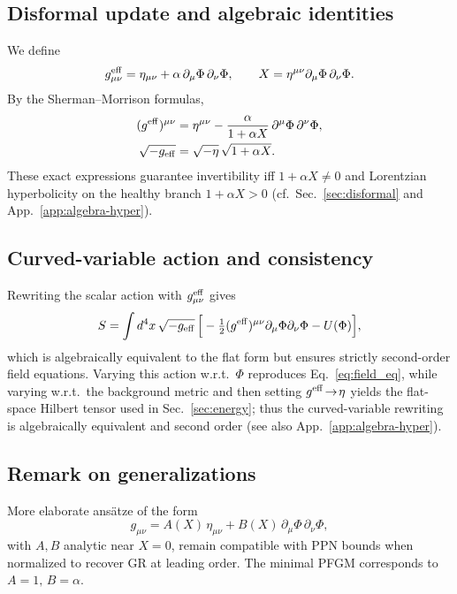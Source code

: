 \documentclass{article}
\begin{document}
\subsection*{Disformal update and algebraic identities}
We define
\begin{equation}
g^{\rm eff}_{\mu\nu}=\eta_{\mu\nu}+\alpha\,\partial_\mu\Phi\,\partial_\nu\Phi, 
\qquad 
X=\eta^{\mu\nu}\partial_\mu\Phi\,\partial_\nu\Phi .
\end{equation}
By the Sherman--Morrison formulas,
\begin{align}
(g^{\rm eff})^{\mu\nu}&=\eta^{\mu\nu}-\frac{\alpha}{1+\alpha X}\,\partial^\mu\Phi\,\partial^\nu\Phi,\\
\sqrt{-g_{\rm eff}}&=\sqrt{-\eta}\,\sqrt{1+\alpha X}.
\end{align}
These exact expressions guarantee invertibility iff $1+\alpha X\neq0$ and Lorentzian hyperbolicity on the healthy branch
$1+\alpha X>0$ (cf.\ Sec.~\ref{sec:disformal} and App.~\ref{app:algebra-hyper}).

\subsection*{Curved-variable action and consistency}
Rewriting the scalar action with $g^{\rm eff}_{\mu\nu}$ gives
\begin{equation}
S=\int d^4x\,\sqrt{-g_{\rm eff}}\,
\Big[-\tfrac12 (g^{\rm eff})^{\mu\nu}\partial_\mu\Phi\partial_\nu\Phi - U(\Phi)\Big],
\end{equation}
which is algebraically equivalent to the flat form but ensures strictly second-order field equations. 
Varying this action w.r.t.\ $\Phi$ reproduces Eq.~\eqref{eq:field_eq}, while varying w.r.t.\ the background metric and then setting $g^{\rm eff}\!\to\!\eta$ yields the flat-space Hilbert tensor used in Sec.~\ref{sec:energy}; thus the curved-variable rewriting is algebraically equivalent and second order (see also App.~\ref{app:algebra-hyper}).

\subsection*{Remark on generalizations}
More elaborate ansätze of the form
\begin{equation}
g_{\mu\nu}=A(X)\,\eta_{\mu\nu}+B(X)\,\partial_\mu\Phi\,\partial_\nu\Phi ,
\end{equation}
with $A,B$ analytic near $X=0$, remain compatible with PPN bounds when normalized to recover GR at leading order. 
The minimal PFGM corresponds to $A=1,\,B=\alpha$.
\end{document}
